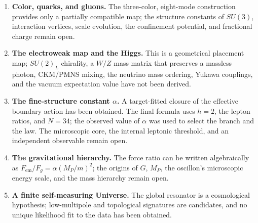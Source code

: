 \documentclass[11pt,a4paper]{article}
\begin{document}
\begin{enumerate}
\item \textbf{Color, quarks, and gluons.} The three-color, eight-mode construction provides only a partially compatible map; the structure constants of $SU(3)$, interaction vertices, scale evolution, the confinement potential, and fractional charge remain open.

\item \textbf{The electroweak map and the Higgs.} This is a geometrical placement map; $SU(2)_L$ chirality, a $W/Z$ mass matrix that preserves a massless photon, CKM/PMNS mixing, the neutrino mass ordering, Yukawa couplings, and the vacuum expectation value have not been derived.

\item \textbf{The fine-structure constant $\alpha$.} A target-fitted closure of the effective boundary action has been obtained. The final formula uses $h=2$, the lepton ratios, and $N=34$; the observed value of $\alpha$ was used to select the branch and the law. The microscopic core, the internal leptonic threshold, and an independent observable remain open.

\item \textbf{The gravitational hierarchy.} The force ratio can be written algebraically as $F_{\mathrm{em}}/F_g=\alpha(M_P/m)^2$; the origins of $G$, $M_P$, the oscillon's microscopic energy scale, and the mass hierarchy remain open.

\item \textbf{A finite self-measuring Universe.} The global resonator is a cosmological hypothesis; low-multipole and topological signatures are candidates, and no unique likelihood fit to the data has been obtained.
\end{enumerate}

{}


\end{document}
